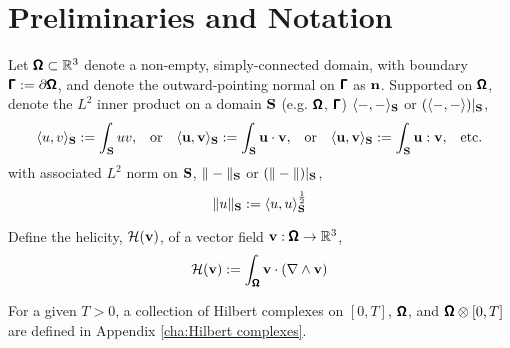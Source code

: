 \section*{Preliminaries and Notation}

    Let $\pmb{\mathsf{\Omega}}  \subset  \mathbb{R}^{3}$ denote a  non-empty, simply-connected domain, with boundary $\pmb{\mathsf{\Gamma}}  :=  \partial\pmb{\mathsf{\Omega}}$, and denote the outward-pointing normal on $\pmb{\mathsf{\Gamma}}$ as $\mathbf{n}$. Supported on $\pmb{\mathsf{\Omega}}$, denote the $L^{2}$ inner product on a domain $\mathbf{S}$ (e.g. $\pmb{\mathsf{\Omega}}$, $\pmb{\mathsf{\Gamma}}$) $\langle-, -\rangle_{\mathbf{S}}$ or $(\langle-, -\rangle)|_{\mathbf{S}}$,
    \begin{align}
        \langle u, v\rangle_{\mathbf{S}}  :=  \int_{\mathbf{S}}uv,  &&
        \text{or}  &&
        \langle \mathbf{u}, \mathbf{v}\rangle_{\mathbf{S}}  :=  \int_{\mathbf{S}}\mathbf{u}\cdot\mathbf{v},  &&
        \text{or}  &&
        \langle \mathbf{u}, \mathbf{v}\rangle_{\mathbf{S}}  :=  \int_{\mathbf{S}}\mathbf{u}:\mathbf{v},  &&
        \text{etc.}
    \end{align}
    with associated $L^{2}$ norm on $\mathbf{S}$, $\|-\|_{\mathbf{S}}$ or $(\|-\|)|_{\mathbf{S}}$,
    \begin{equation}
        \|u\|_{\mathbf{S}}  :=  \langle u, u\rangle_{\mathbf{S}}^{\frac{1}{2}}
    \end{equation}
    
    Define the helicity, $\mathcal{H}(\mathbf{v})$, of a vector field $\mathbf{v} : \pmb{\mathsf{\Omega}} \rightarrow \mathbb{R}^{3}$, 
    \begin{equation}
        \mathcal{H}(\mathbf{v})  :=  \int_{\pmb{\mathsf{\Omega}}}\mathbf{v}\cdot(\nabla\wedge\mathbf{v})
    \end{equation}

    For a given $T > 0$, a collection of Hilbert complexes on $[0, T]$, $\pmb{\mathsf{\Omega}}$, and $\pmb{\mathsf{\Omega}}\otimes[0, T]$ are defined in Appendix \ref{cha:Hilbert complexes}.
    